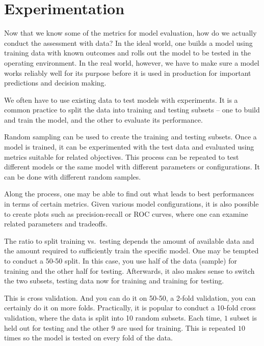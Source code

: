 \documentclass[
  letterpaper,
]{scrbook}
\begin{document}
\section{Experimentation}\label{experimentation}

Now that we know some of the metrics for model evaluation, how do we
actually conduct the assessment with data? In the ideal world, one
builds a model using training data with known outcomes and rolls out the
model to be tested in the operating environment. In the real world,
however, we have to make sure a model works reliably well for its
purpose before it is used in production for important predictions and
decision making.

We often have to use existing data to test models with experiments. It
is a common practice to split the data into training and testing subsets
-- one to build and train the model, and the other to evaluate its
performance.

Random sampling can be used to create the training and testing subsets.
Once a model is trained, it can be experimented with the test data and
evaluated using metrics suitable for related objectives. This process
can be repeated to test different models or the same model with
different parameters or configurations. It can be done with different
random samples.

Along the process, one may be able to find out what leads to best
performances in terms of certain metrics. Given various model
configurations, it is also possible to create plots such as
precision-recall or ROC curves, where one can examine related parameters
and tradeoffs.

The ratio to split training vs.~testing depends the amount of available
data and the amount required to sufficiently train the specific model.
One may be tempted to conduct a 50-50 split. In this case, you use half
of the data (sample) for training and the other half for testing.
Afterwards, it also makes sense to switch the two subsets, testing data
now for training and training for testing.

This is cross validation. And you can do it on 50-50, a 2-fold
validation, you can certainly do it on more folds. Practically, it is
popular to conduct a 10-fold cross validation, where the data is split
into 10 random subsets. Each time, \(1\) subset is held out for testing
and the other \(9\) are used for training. This is repeated \(10\) times
so the model is tested on every fold of the data.
\end{document}
